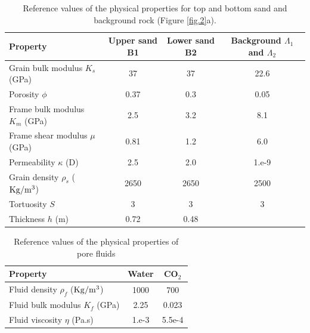 \documentclass[draft]{agujournal2019}
\begin{document}
\begin{table}[!ht]
  \caption{Reference values of the physical properties for top and bottom sand and background rock (Figure \ref{fig.2}a). }
\begin{center}
  \begin{tabular}{ | l  c  c c | }
    \hline
    Property & Upper sand B1 & Lower
     sand B2 & Background $\Lambda_1$ and $\Lambda_2$  \\ \hline
    Grain bulk modulus $K_s$ (\rm{GPa}) & 37 & 37 & 22.6 \\ 
    Porosity $\phi$ & 0.37 & 0.3 & 0.05  \\ 
    Frame bulk modulus $K_m$ (GPa) & 2.5  & 3.2 & 8.1\\ 
    Frame shear modulus $\mu$ (GPa) & 0.81  & 1.2 & 6.0 \\
    Permeability $\kappa$ (D) & 2.5 & 2.0 & 1.e-9 \\
    Grain density $\rho_s$ ($\rm{Kg/m^3}$) &2650 & 2650 & 2500\\ 
    Tortuosity $S$ & 3 & 3 & 3\\
    Thickness $h$ (m) & 0.72 & 0.48 & \\ 
                                       
    \hline
  \end{tabular}
  \label{table.1}
\end{center}
\end{table}

\begin{table}[!ht]
  \caption{Reference values of the physical properties of pore fluids}
\begin{center}
  \begin{tabular}{ | l | c | c |  }
    \hline
    Property & Water & CO$_2$\\ \hline
    Fluid density $\rho_f$ ($\rm{Kg/m^3}$) & 1000 & 700\\
    Fluid bulk modulus $K_f$ (\rm{GPa}) & 2.25 & 0.023\\
    Fluid viscosity $\eta$ (\rm{Pa.s})& 1.e-3 & 5.5e-4\\
    \hline
  \end{tabular}
  \label{table.2}
\end{center}
\end{table}
\end{document}
